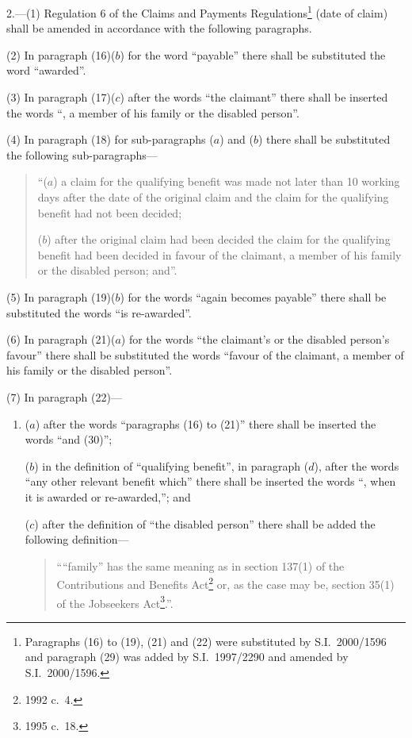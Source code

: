 \documentclass[12pt,a4paper]{article}
\begin{document}
2.---(1)  Regulation 6 of the Claims and Payments Regulations\footnote{Paragraphs (16) to (19), (21) and (22) were substituted by S.I.\ 2000/1596 and paragraph (29) was added by S.I.\ 1997/2290 and amended by S.I.\ 2000/1596.} (date of claim) shall be amended in accordance with the following paragraphs.

(2) In paragraph (16)($b$)  for the word “payable” there shall be substituted the word “awarded”.

(3) In paragraph (17)($c$)  after the words “the claimant” there shall be inserted the words “, a member of his family or the disabled person”.

(4) In paragraph (18) for sub-paragraphs ($a$)  and ($b$)  there shall be substituted the following sub-paragraphs—
\begin{quotation}
“($a$) a claim for the qualifying benefit was made not later than 10 working days after the date of the original claim and the claim for the qualifying benefit had not been decided;

($b$) after the original claim had been decided the claim for the qualifying benefit had been decided in favour of the claimant, a member of his family or the disabled person; and”.
\end{quotation}

(5) In paragraph (19)($b$)  for the words “again becomes payable” there shall be substituted the words “is re-awarded”.

(6) In paragraph (21)($a$)  for the words “the claimant’s or the disabled person’s favour” there shall be substituted the words “favour of the claimant, a member of his family or the disabled person”.

(7) In paragraph (22)—
\begin{enumerate}\item[]
($a$) after the words “paragraphs (16) to (21)” there shall be inserted the words “and (30)”;

($b$) in the definition of “qualifying benefit”, in paragraph ($d$), after the words “any other relevant benefit which” there shall be inserted the words “, when it is awarded or re-awarded,”; and

($c$) after the definition of “the disabled person” there shall be added the following definition—
\begin{quotation}
    ““family” has the same meaning as in section 137(1) of the Contributions and Benefits Act\footnote{1992 c.\ 4.} or, as the case may be, section 35(1) of the Jobseekers Act\footnote{1995 c.\ 18.}.”. 
\end{quotation}
\end{enumerate}
\end{document}
